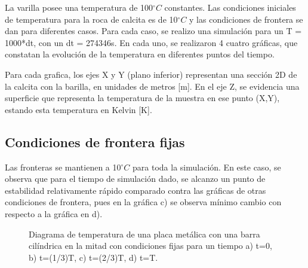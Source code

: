 \documentclass{article}
\begin{document}
La varilla posee una temperatura de 100$^{\circ}C$ constantes. Las condiciones iniciales de temperatura para la roca de calcita es de 10$^{\circ}C$ y las condiciones de frontera se dan para diferentes casos. Para cada caso, se realizo una simulación para un T = 1000*dt, con un dt = 274346s. En cada uno, se realizaron 4 cuatro gráficas, que constatan la evolución de la temperatura en diferentes puntos del tiempo.

Para cada grafica, los ejes X y Y (plano inferior) representan una sección 2D de la calcita con la barilla, en unidades de metros [m]. En el eje Z, se evidencia una superficie que representa la temperatura de la muestra en ese punto (X,Y), estando esta temperatura en Kelvin [K]. 

\subsection*{Condiciones de frontera fijas}

Las fronteras se mantienen a 10$^{\circ}C$ para toda la simulación. En este caso, se observa que para el tiempo de simulación dado, se alcanzo un punto de estabilidad relativamente rápido comparado contra las gráficas de otras condiciones de frontera, pues en la gráfica c) se observa mínimo cambio con respecto a la gráfica en d).
\begin{figure}[H]
    \centering
    \caption{Diagrama de temperatura de una placa metálica con una barra cilíndrica en la mitad con condiciones fijas para un tiempo a) t=0, b) t=(1/3)T, c) t=(2/3)T, d) t=T.}
    \label{fig:CondicionesFijasTemp}
\end{figure}
\end{document}
